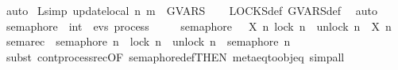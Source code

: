 \begin{isabellebody}
\ auto%
\endisatagproof
{\isafoldproof}%
%
\isadelimproof
%
\endisadelimproof
\isanewline
{}\isamarkupfalse%
\ L{}{}{\isacharbrackleft}{\kern0pt}simp{\isacharbrackright}{\kern0pt}{\isacharcolon}{\kern0pt}\ {\isacartoucheopen}update\isactrlsub l\isactrlsub o\isactrlsub c\isactrlsub a\isactrlsub l\ n\ m\ {\isasymnotin}\ GVARS{\isacartoucheclose}%
\isadelimproof
\ \ %
\endisadelimproof
%
\isatagproof
{}\isamarkupfalse%
\ LOCKS{\isacharunderscore}{\kern0pt}def\ GVARS{\isacharunderscore}{\kern0pt}def\ \isamarkupfalse%
\ auto%
\endisatagproof
{\isafoldproof}%
%
\isadelimproof
%
\endisadelimproof
%
\isadelimdocument
%
\endisadelimdocument
%
\isatagdocument
%
\isamarkuptrue%
%
\endisatagdocument
{\isafolddocument}%
%
\isadelimdocument
%
\endisadelimdocument
{}\isamarkupfalse%
\ semaphore\ {\isacharcolon}{\kern0pt}{\isacharcolon}{\kern0pt}\ {\isacartoucheopen}int\ {\isasymRightarrow}\ evs\ process{\isacartoucheclose}\isanewline
\ \ \ \ \ {\isacartoucheopen}semaphore\ {\isasymequiv}\ {\isasymmu}\ X{\isachardot}{\kern0pt}\ {\isacharparenleft}{\kern0pt}{\isasymlambda}n{\isachardot}{\kern0pt}\ lock\ n\ {\isasymrightarrow}\ unlock\ n\ {\isasymrightarrow}\ X\ n{\isacharparenright}{\kern0pt}{\isacartoucheclose}\isanewline
\isanewline
{}\isamarkupfalse%
\ sema{\isacharunderscore}{\kern0pt}rec\ {\isacharcolon}{\kern0pt}\ {\isacartoucheopen}semaphore\ n\ {\isacharequal}{\kern0pt}\ lock\ n\ {\isasymrightarrow}\ unlock\ n\ {\isasymrightarrow}\ semaphore\ n{\isacartoucheclose}\isanewline
%
\isadelimproof
\ \ %
\endisadelimproof
%
\isatagproof
{}\isamarkupfalse%
\ {\isacharparenleft}{\kern0pt}subst\ cont{\isacharunderscore}{\kern0pt}process{\isacharunderscore}{\kern0pt}rec{\isacharbrackleft}{\kern0pt}OF\ semaphore{\isacharunderscore}{\kern0pt}def{\isacharbrackleft}{\kern0pt}THEN\ meta{\isacharunderscore}{\kern0pt}eq{\isacharunderscore}{\kern0pt}to{\isacharunderscore}{\kern0pt}obj{\isacharunderscore}{\kern0pt}eq{\isacharbrackright}{\kern0pt}{\isacharbrackright}{\kern0pt}{\isacharparenright}{\kern0pt}\ simp{\isacharunderscore}{\kern0pt}all%
\endisatagproof
{\isafoldproof}%
%
\isadelimproof
%
\endisadelimproof
%
\isadelimdocument
%
\endisadelimdocument
%
\isatagdocument
%
\isamarkuptrue%
%
\endisatagdocument
{\isafolddocument}%
%
\isadelimdocument
%
\endisadelimdocument
{}\isamarkupfalse%

\end{isabellebody}
